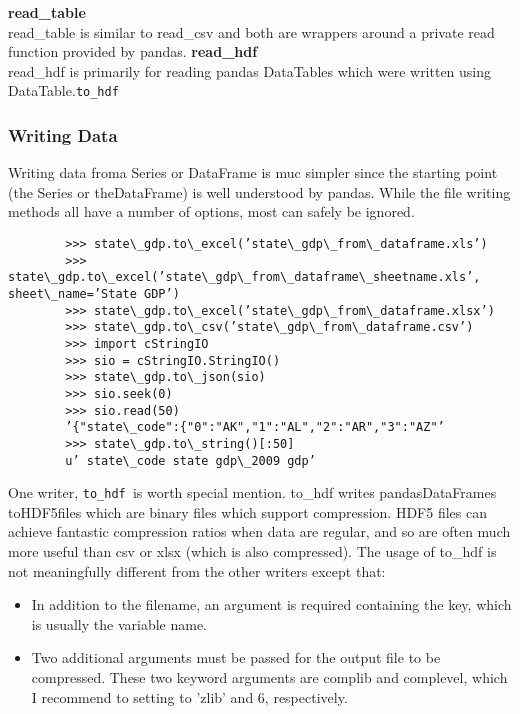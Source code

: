 \documentclass[KSmain.tex]{subfiles}
\begin{document}
	\textbf{read\_table}\\
	read\_table is similar to read\_csv and both are wrappers around a private read function provided by pandas.
	\textbf{read\_hdf}\\
	read\_hdf is primarily for reading pandas DataTables which were written using DataTable.\texttt{to\_hdf}
	\subsubsection{Writing Data}
	Writing data froma Series or DataFrame is muc simpler since the starting point (the Series or theDataFrame)
	is well understood by pandas. While the file writing methods all have a number of options, most can safely
	be ignored.
	\begin{framed}
		\begin{verbatim}
		>>> state\_gdp.to\_excel(’state\_gdp\_from\_dataframe.xls’)
		>>> state\_gdp.to\_excel(’state\_gdp\_from\_dataframe\_sheetname.xls’, sheet\_name=’State GDP’)
		>>> state\_gdp.to\_excel(’state\_gdp\_from\_dataframe.xlsx’)
		>>> state\_gdp.to\_csv(’state\_gdp\_from\_dataframe.csv’)
		>>> import cStringIO
		>>> sio = cStringIO.StringIO()
		>>> state\_gdp.to\_json(sio)
		>>> sio.seek(0)
		>>> sio.read(50)
		’{"state\_code":{"0":"AK","1":"AL","2":"AR","3":"AZ"’
		>>> state\_gdp.to\_string()[:50]
		u’ state\_code state gdp\_2009 gdp’
		\end{verbatim}
	\end{framed}
	One writer, \texttt{to\_hdf }is worth special mention. to\_hdf writes pandasDataFrames toHDF5files which are
	binary files which support compression. HDF5 files can achieve fantastic compression ratios when data
	are regular, and so are often much more useful than csv or xlsx (which is also compressed). The usage of
	to\_hdf is not meaningfully different from the other writers except that:
	\begin{itemize}
		\item In addition to the filename, an argument is required containing the key, which is usually the variable
		name.
		\item Two additional arguments must be passed for the output file to be compressed. These two keyword
		arguments are complib and complevel, which I recommend to setting to ’zlib’ and 6, respectively.
	\end{itemize}
\end{document}
